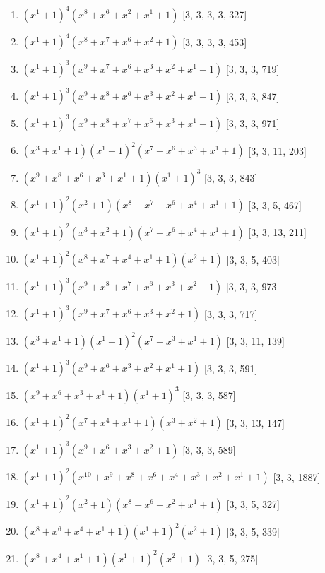 \documentclass[10pt,twocolumn]{article}
\begin{document}
\begin{enumerate}
\item $(x^{1} + 1)^{4}(x^{8} + x^{6} + x^{2} + x^{1} + 1)$  [3, 3, 3, 3, 327]
\item $(x^{1} + 1)^{4}(x^{8} + x^{7} + x^{6} + x^{2} + 1)$  [3, 3, 3, 3, 453]
\item $(x^{1} + 1)^{3}(x^{9} + x^{7} + x^{6} + x^{3} + x^{2} + x^{1} + 1)$  [3, 3, 3, 719]
\item $(x^{1} + 1)^{3}(x^{9} + x^{8} + x^{6} + x^{3} + x^{2} + x^{1} + 1)$  [3, 3, 3, 847]
\item $(x^{1} + 1)^{3}(x^{9} + x^{8} + x^{7} + x^{6} + x^{3} + x^{1} + 1)$  [3, 3, 3, 971]
\item $(x^{3} + x^{1} + 1)(x^{1} + 1)^{2}(x^{7} + x^{6} + x^{3} + x^{1} + 1)$  [3, 3, 11, 203]
\item $(x^{9} + x^{8} + x^{6} + x^{3} + x^{1} + 1)(x^{1} + 1)^{3}$  [3, 3, 3, 843]
\item $(x^{1} + 1)^{2}(x^{2} + 1)(x^{8} + x^{7} + x^{6} + x^{4} + x^{1} + 1)$  [3, 3, 5, 467]
\item $(x^{1} + 1)^{2}(x^{3} + x^{2} + 1)(x^{7} + x^{6} + x^{4} + x^{1} + 1)$  [3, 3, 13, 211]
\item $(x^{1} + 1)^{2}(x^{8} + x^{7} + x^{4} + x^{1} + 1)(x^{2} + 1)$  [3, 3, 5, 403]
\item $(x^{1} + 1)^{3}(x^{9} + x^{8} + x^{7} + x^{6} + x^{3} + x^{2} + 1)$  [3, 3, 3, 973]
\item $(x^{1} + 1)^{3}(x^{9} + x^{7} + x^{6} + x^{3} + x^{2} + 1)$  [3, 3, 3, 717]
\item $(x^{3} + x^{1} + 1)(x^{1} + 1)^{2}(x^{7} + x^{3} + x^{1} + 1)$  [3, 3, 11, 139]
\item $(x^{1} + 1)^{3}(x^{9} + x^{6} + x^{3} + x^{2} + x^{1} + 1)$  [3, 3, 3, 591]
\item $(x^{9} + x^{6} + x^{3} + x^{1} + 1)(x^{1} + 1)^{3}$  [3, 3, 3, 587]
\item $(x^{1} + 1)^{2}(x^{7} + x^{4} + x^{1} + 1)(x^{3} + x^{2} + 1)$  [3, 3, 13, 147]
\item $(x^{1} + 1)^{3}(x^{9} + x^{6} + x^{3} + x^{2} + 1)$  [3, 3, 3, 589]
\item $(x^{1} + 1)^{2}(x^{10} + x^{9} + x^{8} + x^{6} + x^{4} + x^{3} + x^{2} + x^{1} + 1)$  [3, 3, 1887]
\item $(x^{1} + 1)^{2}(x^{2} + 1)(x^{8} + x^{6} + x^{2} + x^{1} + 1)$  [3, 3, 5, 327]
\item $(x^{8} + x^{6} + x^{4} + x^{1} + 1)(x^{1} + 1)^{2}(x^{2} + 1)$  [3, 3, 5, 339]
\item $(x^{8} + x^{4} + x^{1} + 1)(x^{1} + 1)^{2}(x^{2} + 1)$  [3, 3, 5, 275]

\end{enumerate}
\end{document}
